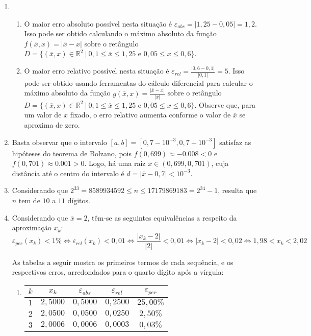 \documentclass[12pt,a4paper]{article}
\newcommand*\R{\mathbb{R}}
\begin{document}
\begin{enumerate}
\item
\begin{enumerate}
\item O maior erro absoluto possível nesta situação é $\varepsilon_{abs} = |1,25 - 0,05| = 1,2$. Isso pode ser obtido calculando o máximo absoluto da função $f(\overline{x}, x) = |\overline{x} - x|$ sobre o retângulo $D = \{ (\overline{x}, x) \in \R^2 \ |\ 0,1 \leq \overline{x} \leq 1,25 \text{ e } 0,05 \leq x \leq 0,6 \}$.

\item O maior erro relativo possível nesta situação é $\varepsilon_{rel} = \frac{|0,6 - 0,1| }{ |0,1|} = 5$. Isso pode ser obtido usando ferramentas do cálculo diferencial para calcular o máximo absoluto da função $g(\overline{x}, x) = \frac{|\overline{x}-x| }{ |\overline{x}|}$ sobre o retângulo $D = \{ (\overline{x}, x) \in \R^2 \ |\ 0,1 \leq \overline{x} \leq 1,25 \text{ e } 0,05 \leq x \leq 0,6 \}$. Observe que, para um valor de $x$ fixado, o erro relativo aumenta conforme o valor de $\overline{x}$ se aproxima de zero.
\end{enumerate}

\item Basta observar que o intervalo $[a,b] = [0,7-10^{-3}, 0,7+10^{-3}]$ satisfaz as hipóteses do teorema de Bolzano, pois $f(0,699) \approx -0.008 < 0$ e $f(0,701) \approx 0.001 > 0$. Logo, há uma raiz $\overline{x} \in (0,699, 0,701)$, cuja distância até o centro do intervalo é $d = |\overline{x} - 0,7| < 10^{-3}$.
\item Considerando que $2^{33} = 8589934592 \leq n \leq 17179869183 = 2^{34}-1$, resulta que $n$ tem de $10$ a $11$ dígitos.
\item Considerando que $\overline{x} = 2$, têm-se as seguintes equivalências a respeito da aproximação $x_k$:
\[
\varepsilon_{per}(x_k) < 1\%
\Leftrightarrow
\varepsilon_{rel}(x_k) < 0,01
\Leftrightarrow
\frac{|x_k - 2|}{|2|} < 0,01
\Leftrightarrow
|x_k - 2| < 0,02
\Leftrightarrow
1,98 < x_k < 2,02
\]

As tabelas a seguir mostra os primeiros termos de cada sequência, e os respectivos erros, arredondados para o quarto dígito após a vírgula:
\begin{enumerate}
\item
\begin{tabular}{|c|c|c|c|c|}
\hline
$k$ & $x_k$ & $\varepsilon_{abs}$ & $\varepsilon_{rel}$ & $\varepsilon_{per}$ \\
\hline
$1$ & $2,5000$ & $0,5000$ & $0,2500$ & $25,00\%$ \\
\hline
$2$ & $2,0500$ & $0,0500$ & $0,0250$ & $2,50\%$ \\
\hline
$3$ & $2,0006$ & $0,0006$ & $0,0003$ & $0,03\%$ \\
\hline
\end{tabular}


\end{enumerate}
\end{enumerate}
\end{document}
